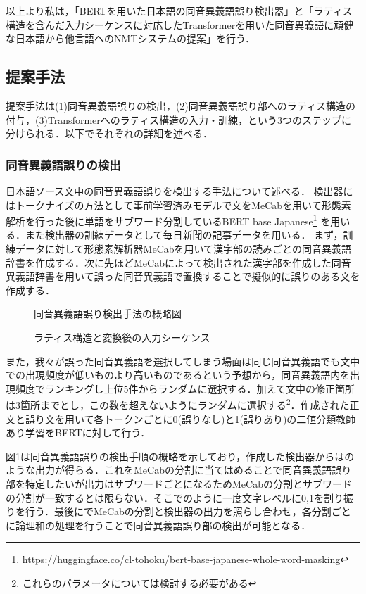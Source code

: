 \documentclass[a4j,10.5pt, twocolumn]{jarticle}
\begin{document}
以上より私は，「BERTを用いた日本語の同音異義語誤り検出器」と「ラティス構造を含んだ入力シーケンスに対応したTransformerを用いた同音異義語に頑健な日本語から他言語へのNMTシステムの提案」を行う．

\subsection{提案手法}
提案手法は(1)同音異義語誤りの検出，(2)同音異義語誤り部へのラティス構造の付与，(3)Transformerへのラティス構造の入力・訓練，という3つのステップに分けられる．以下でそれぞれの詳細を述べる．
\subsubsection{同音異義語誤りの検出}
日本語ソース文中の同音異義語誤りを検出する手法について述べる．
検出器にはトークナイズの方法として事前学習済みモデルで文をMeCabを用いて形態素解析を行った後に単語をサブワード分割しているBERT base Japanese\footnote{https://huggingface.co/cl-tohoku/bert-base-japanese-whole-word-masking}
を用いる．また検出器の訓練データとして毎日新聞の記事データを用いる．
まず，訓練データに対して形態素解析器MeCabを用いて漢字部の読みごとの同音異義語辞書を作成する．次に先ほどMeCabによって検出された漢字部を作成した同音異義語辞書を用いて誤った同音異義語で置換することで擬似的に誤りのある文を作成する．

\begin{figure}[h]
   \centering
    
    \caption{同音異義語誤り検出手法の概略図}
\end{figure}

\begin{figure}[h]
   \centering
    
    \caption{ラティス構造と変換後の入力シーケンス}
\end{figure}

また，我々が誤った同音異義語を選択してしまう場面は同じ同音異義語でも文中での出現頻度が低いものより高いものであるという予想から，同音異義語内を出現頻度でランキングし上位5件からランダムに選択する．加えて文中の修正箇所は3箇所までとし，この数を超えないようにランダムに選択する\footnote{これらのパラメータについては検討する必要がある}．作成された正文と誤り文を用いて各トークンごとに0(誤りなし)と1(誤りあり)の二値分類教師あり学習をBERTに対して行う．

図1は同音異義語誤りの検出手順の概略を示しており，作成した検出器からはのような出力が得らる．これをMeCabの分割に当てはめることで同音異義語誤り部を特定したいが出力はサブワードごとになるためMeCabの分割とサブワードの分割が一致するとは限らない．そこでのように一度文字レベルに0,1を割り振りを行う．最後にでMeCabの分割と検出器の出力を照らし合わせ，各分割ごとに論理和の処理を行うことで同音異義語誤り部の検出が可能となる．
\end{document}
